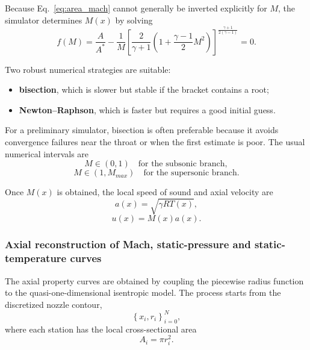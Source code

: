 \documentclass[11pt,a4paper]{article}
\begin{document}
Because Eq.~\eqref{eq:area_mach} cannot generally be inverted explicitly for $M$, the simulator determines $M(x)$ by solving
\begin{equation}
f(M)=\frac{A}{A^*} - \frac{1}{M}
\left[
\frac{2}{\gamma+1}
\left(1+\frac{\gamma-1}{2}M^2\right)
\right]^{\frac{\gamma+1}{2(\gamma-1)}}=0 .
\label{eq:area_mach_residual}
\end{equation}

Two robust numerical strategies are suitable:
\begin{itemize}
    \item \textbf{bisection}, which is slower but stable if the bracket contains a root;
    \item \textbf{Newton--Raphson}, which is faster but requires a good initial guess.
\end{itemize}

For a preliminary simulator, bisection is often preferable because it avoids convergence failures near the throat or when the first estimate is poor. The usual numerical intervals are
\begin{equation}
M\in(0,1) \quad \text{for the subsonic branch},
\end{equation}
\begin{equation}
M\in(1,M_{max}) \quad \text{for the supersonic branch}.
\end{equation}

Once $M(x)$ is obtained, the local speed of sound and axial velocity are
\begin{equation}
a(x)=\sqrt{\gamma R T(x)},
\end{equation}
\begin{equation}
u(x)=M(x)a(x).
\label{eq:velocity}
\end{equation}


\subsubsection{Axial reconstruction of Mach, static-pressure and static-temperature curves}

The axial property curves are obtained by coupling the piecewise radius function to the quasi-one-dimensional isentropic model. The process starts from the discretized nozzle contour,
\begin{equation}
\left\{x_i,r_i\right\}_{i=0}^{N},
\end{equation}
where each station has the local cross-sectional area
\begin{equation}
A_i=\pi r_i^2.
\label{eq:local_area_discrete}
\end{equation}
\end{document}
